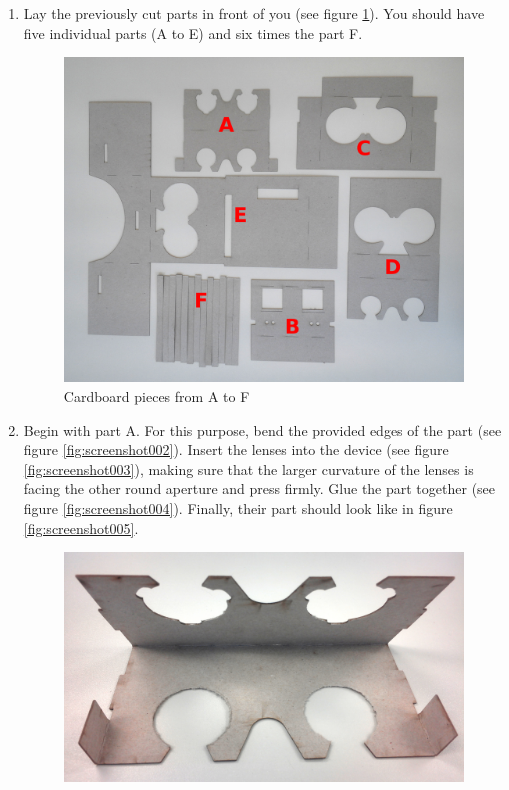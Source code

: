 \documentclass[../../Cardboard_Assembling]{subfiles}
\begin{document}
\begin{enumerate}
	\item Lay the previously cut parts in front of you (see figure \ref{fig:screenshot001}). You should have five individual parts (A to E) and six times the part F.
	 \begin{figure}[htb]
		\centering
		\includegraphics[width=1.0\linewidth]{all_parts}
		\caption{Cardboard pieces from A to F}
		\label{fig:screenshot001}
	\end{figure}
	\clearpage
	\item Begin with part A. For this purpose, bend the provided edges of the part (see figure \ref{fig:screenshot002}). Insert the lenses into the device (see figure \ref{fig:screenshot003}), making sure that the larger curvature of the lenses is facing the other round aperture and press firmly. Glue the part together (see figure \ref{fig:screenshot004}). Finally, their part should look like in figure \ref{fig:screenshot005}.
	\begin{figure}[htb]
		\centering
		\includegraphics[width=0.7\linewidth]{partA01}

\end{figure}
\end{enumerate}
\end{document}
